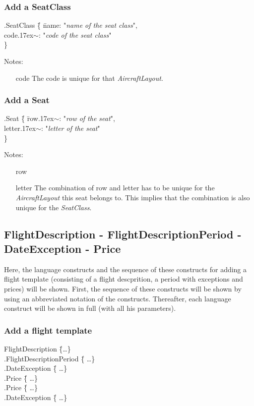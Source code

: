 \documentclass[a4paper,11pt]{article}
\newcommand{\dsltype}[1]{\textit{#1}}
\newcommand{\mytilde}{{\raise.17ex\hbox{\(\scriptstyle\sim\)}}}
\begin{document}
\subsubsection*{Add a SeatClass}
\begin{tabbing}
.SeatClass \= \{ \= name: "\textit{name of the seat class}", \\
	\> \> code\mytilde: "\textit{code of the seat class}" \\
\> \} \\
\end{tabbing}
Notes:
\begin{enumerate}
\item[code] The code is unique for that \dsltype{AircraftLayout}.
\end{enumerate}

\subsubsection*{Add a Seat}
\begin{tabbing}
.Seat \= \{ \= row\mytilde: "\textit{row of the seat}", \\
	\> \> letter\mytilde: "\textit{letter of the seat}" \\
\> \} \\
\end{tabbing}
Notes:
\begin{enumerate}
\item[row]
\item[letter] The combination of row and letter has to be unique for the \dsltype{AircraftLayout} this seat belongs to. This implies that the combination is also unique for the \dsltype{SeatClass}.
\end{enumerate}

\subsection*{FlightDescription - FlightDescriptionPeriod - DateException - Price}
Here, the language constructs and the sequence of these constructs for adding a flight template (consisting of a flight descprition, a period with exceptions and prices) will be shown. First, the sequence of these constructs will be shown by using an abbreviated notation of the constructs. Thereafter, each language construct will be shown in full (with all his parameters).

\subsubsection*{Add a flight template}
\begin{tabbing}
FlightDescription \= \{\ldots \} \\
\> .FlightDescriptionPeriod \= \{ \ldots \} \\
\> \> .DateException \= \{ \ldots \} \\
\> \> .Price \= \{ \ldots \} \\
\> \> .Price \= \{ \ldots \} \\
\> \> .DateException \= \{ \ldots \} \\
\end{tabbing}
\end{document}

